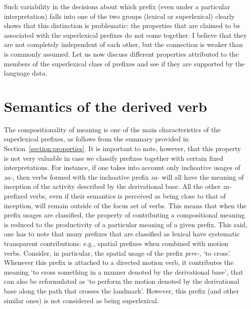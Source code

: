 Such variability in the decisions about which prefix (even under a particular interpretation) falls into one of the two groups (lexical or superlexical) clearly shows that this distinction is problematic: the properties that are claimed to be associated with the superlexical prefixes do not come together. I believe that they are not completely independent of each other, but the connection is weaker than is commonly assumed. Let us now discuss different properties attributed to the members of the superlexical class of prefixes and see if they are supported by the language data.



\section{Semantics of the derived verb}\label{section:new:compositionality}
The compositionality of meaning is one of the main characteristics of the superlexical prefixes, as follows from the summary provided in Section~\ref{section:properties}. It is important to note, however, that this property is not very valuable in case we classify prefixes together with certain fixed interpretations. For instance, if one takes into account only inchoative usages of \textit{za-}, then verbs formed with the inchoative prefix \textit{za-} will all have the meaning of inception of the activity described by the derivational base. All the other \textit{za-}prefixed verbs, even if their semantics is perceived as being close to that of inception, will remain outside of the focus set of verbs. This means that when the prefix usages are classified, the property of contributing a compositional meaning is reduced to the productivity of a particular meaning of a given prefix. This said, one has to note that many prefixes that are classified as lexical have systematic transparent contributions: e.g., spatial prefixes when combined with motion verbs. Consider, in particular, the spatial usage of the prefix \textit{pere-}, `to cross'. Whenever this prefix is attached to a directed motion verb, it contributes the meaning `to cross something in a manner denoted by the derivational base', that can also be reformulated as `to perform the motion denoted by the derivational base along the path that crosses the landmark'. However, this prefix (and other similar ones) is not considered as being superlexical.

